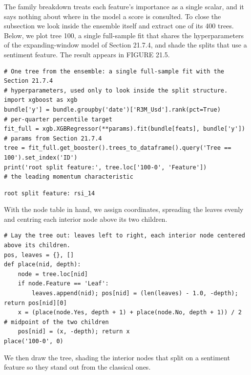 The family breakdown treats each feature's importance as a single scalar, and it says nothing about where in the model a score is consulted. To close the subsection we look inside the ensemble itself and extract one of its 400 trees. Below, we plot tree 100, a single full-sample fit that shares the hyperparameters of the expanding-window model of Section 21.7.4, and shade the splits that use a sentiment feature. The result appears in FIGURE 21.5.

\begin{verbatim}
# One tree from the ensemble: a single full-sample fit with the Section 21.7.4
# hyperparameters, used only to look inside the split structure.
import xgboost as xgb
bundle['y'] = bundle.groupby('date')['R3M_Usd'].rank(pct=True)          # per-quarter percentile target
fit_full = xgb.XGBRegressor(**params).fit(bundle[feats], bundle['y'])   # params from Section 21.7.4
tree = fit_full.get_booster().trees_to_dataframe().query('Tree == 100').set_index('ID')
print('root split feature:', tree.loc['100-0', 'Feature'])             # the leading momentum characteristic
\end{verbatim}

\begin{verbatim}
root split feature: rsi_14
\end{verbatim}

With the node table in hand, we assign coordinates, spreading the leaves evenly and centring each interior node above its two children.

\begin{verbatim}
# Lay the tree out: leaves left to right, each interior node centered above its children.
pos, leaves = {}, []
def place(nid, depth):
    node = tree.loc[nid]
    if node.Feature == 'Leaf':
        leaves.append(nid); pos[nid] = (len(leaves) - 1.0, -depth); return pos[nid][0]
    x = (place(node.Yes, depth + 1) + place(node.No, depth + 1)) / 2    # midpoint of the two children
    pos[nid] = (x, -depth); return x
place('100-0', 0)
\end{verbatim}

We then draw the tree, shading the interior nodes that split on a sentiment feature so they stand out from the classical ones.

